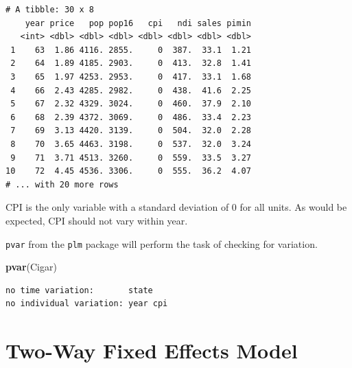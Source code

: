 \documentclass[]{book}
\newenvironment{Shaded}{\begin{snugshade}}{\end{snugshade}}
\newcommand{\CommentTok}[1]{\textcolor[rgb]{0.56,0.35,0.01}{\textit{#1}}}
\newcommand{\KeywordTok}[1]{\textcolor[rgb]{0.13,0.29,0.53}{\textbf{#1}}}
\newcommand{\NormalTok}[1]{#1}
\newcommand{\OperatorTok}[1]{\textcolor[rgb]{0.81,0.36,0.00}{\textbf{#1}}}
\newcommand{\StringTok}[1]{\textcolor[rgb]{0.31,0.60,0.02}{#1}}
\begin{document}
\begin{Shaded}
\end{Shaded}

\begin{verbatim}
# A tibble: 30 x 8
    year price   pop pop16   cpi   ndi sales pimin
   <int> <dbl> <dbl> <dbl> <dbl> <dbl> <dbl> <dbl>
 1    63  1.86 4116. 2855.     0  387.  33.1  1.21
 2    64  1.89 4185. 2903.     0  413.  32.8  1.41
 3    65  1.97 4253. 2953.     0  417.  33.1  1.68
 4    66  2.43 4285. 2982.     0  438.  41.6  2.25
 5    67  2.32 4329. 3024.     0  460.  37.9  2.10
 6    68  2.39 4372. 3069.     0  486.  33.4  2.23
 7    69  3.13 4420. 3139.     0  504.  32.0  2.28
 8    70  3.65 4463. 3198.     0  537.  32.0  3.24
 9    71  3.71 4513. 3260.     0  559.  33.5  3.27
10    72  4.45 4536. 3306.     0  555.  36.2  4.07
# ... with 20 more rows
\end{verbatim}

CPI is the only variable with a standard deviation of 0 for all units. As would be expected, CPI should not vary within year.

\texttt{pvar} from the \texttt{plm} package will perform the task of checking for variation.

\begin{Shaded}
\begin{Highlighting}[]
\KeywordTok{pvar}\NormalTok{(Cigar)}
\end{Highlighting}
\end{Shaded}

\begin{verbatim}
no time variation:       state 
no individual variation: year cpi 
\end{verbatim}

\hypertarget{two-way-fixed-effects-model}{%
\section{Two-Way Fixed Effects Model}\label{two-way-fixed-effects-model}}
\end{document}
